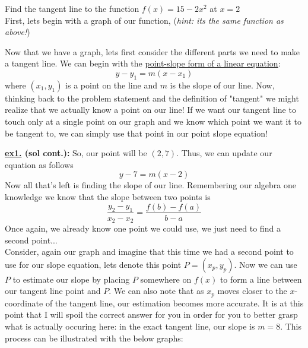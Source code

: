\documentclass[addpoints]{exam}
\begin{document}
  \begin{questions}
    \question Find the tangent line to the function $f(x)=15-2x^2$ at $x=2$ \\
    \ifprintanswers
      First, lets begin with a graph of our function, (\textit{hint: its the same function as above!})
      \vspace{0.1in}
      \newline
      \begin{minipage}{0.45\linewidth}
      \end{minipage}
      \hfill 
      \begin{minipage}{0.45\linewidth}
        Now that we have a graph, lets first consider the different parts we need to make a tangent line. We can begin with the \underline{point-slope form of a linear equation}:
        \[y-y_1 = m(x-x_1)\]
        where $(x_1, y_1)$ is a point on the line and $m$ is the slope of our line. Now, thinking back to the problem statement and the definition of "tangent" we might realize that we actually know a point on our line! If we want our tangent line to touch only at a single point on our graph and we know which point we want it to be tangent to, we can simply use that point in our point slope equation!
      \end{minipage}
      \newpage 
      \large\textbf{\underline{ex1.} (sol cont.):} \normalsize So, our point will be $({2}, {7})$. Thus, we can update our equation as follows
      \[
        y-7 = m(x-2)
      \]
      Now all that's left is finding the slope of our line. Remembering our algebra one knowledge we know that the slope between two points is 
      \[
        \frac{y_2-y_1}{x_2-x_2} = \frac{f(b)-f(a)}{b-a}
      \]
      Once again, we already know one point we could use, we just need to find a second point...\\ 
      Consider, again our graph and imagine that this time we had a second point to use for our slope equation, lets denote this point $P = (x_p, y_p)$. Now we can use $P$ to estimate our slope by placing $P$ somewhere on $f(x)$ to form a line between our tangent line point and $P$. We can also note that as $x_p$ moves closer to the $x$-coordinate of the tangent line, our estimation becomes more accurate. It is at this point that I will spoil the correct answer for you in order for you to better grasp what is actually occuring here: in the exact tangent line, our slope is $m=8$. This process can be illustrated with the below graphs: 

\end{questions}
\end{document}
